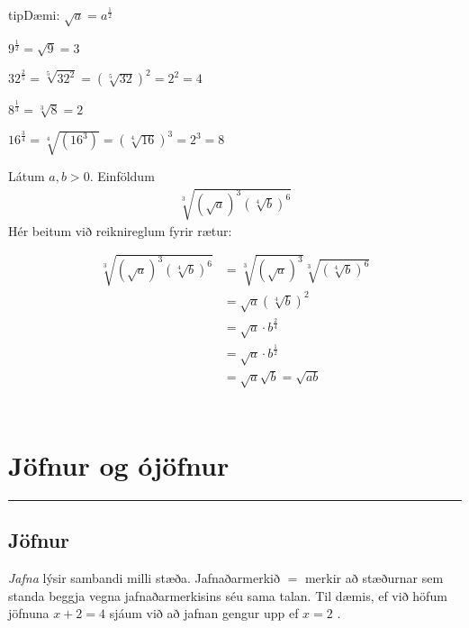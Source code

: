 \documentclass[a4paper,10pt,icelandic]{sphinxmanual}
\begin{document}
\begin{sphinxadmonition}{tip}{Dæmi:}
 \(\sqrt{a}=a^{\frac12}\)

 \(9^{\frac12}=\sqrt{9}=3\)

 \(32^{\frac25}=\sqrt[5]{32^2}=\left(\sqrt[5]{32}\right)^2=2^2=4\)

 \(8^{\frac{1}{3}}=\sqrt[3]8 = 2\)

 \(16^{\frac{3}{4}}=\sqrt[4]{(16^3)}=\left(\sqrt[4]{16}\right)^3=2^3=8\)

 Látum \(a,b > 0\). Einföldum
\begin{equation*}
\begin{split}\sqrt[3]{\left(\sqrt{a}\right)^3 \left(\sqrt[4]{b}\right)^6 }\end{split}
\end{equation*}
Hér beitum við reiknireglum fyrir rætur:
\begin{align*}\!\begin{aligned}
\begin{aligned}\\
\sqrt[3]{\left(\sqrt{a}\right)^3 \left(\sqrt[4]{b}\right)^6 }
&= \sqrt[3]{\left(\sqrt{a}\right)^3 } \sqrt[3]{ \left(\sqrt[4]{b}\right)^6 } \\
&= \sqrt{a} \left(\sqrt[4]{b}\right)^2 \\
&= \sqrt{a} \cdot b^{\frac24} \\
&=\sqrt{a} \cdot b^{\frac12} \\
&=\sqrt{a} \sqrt{b} = \sqrt{ab}\\\\
\end{aligned}\\
\end{aligned}\end{align*}\end{sphinxadmonition}


\chapter{Jöfnur og ójöfnur}
\label{\detokenize{Kafli02:jofnur-og-ojofnur}}\label{\detokenize{Kafli02::doc}}

\bigskip\hrule\bigskip



\section{Jöfnur}
\label{\detokenize{Kafli02:jofnur}}\label{\detokenize{Kafli02:s-jofnur}}
\textit{Jafna} lýsir sambandi milli stæða.
Jafnaðarmerkið \(=\) merkir að stæðurnar sem standa beggja vegna jafnaðarmerkisins séu sama talan.
Til dæmis, ef við höfum jöfnuna \(x+2=4\) sjáum við að jafnan gengur upp ef \(x=2\) .
\end{document}
